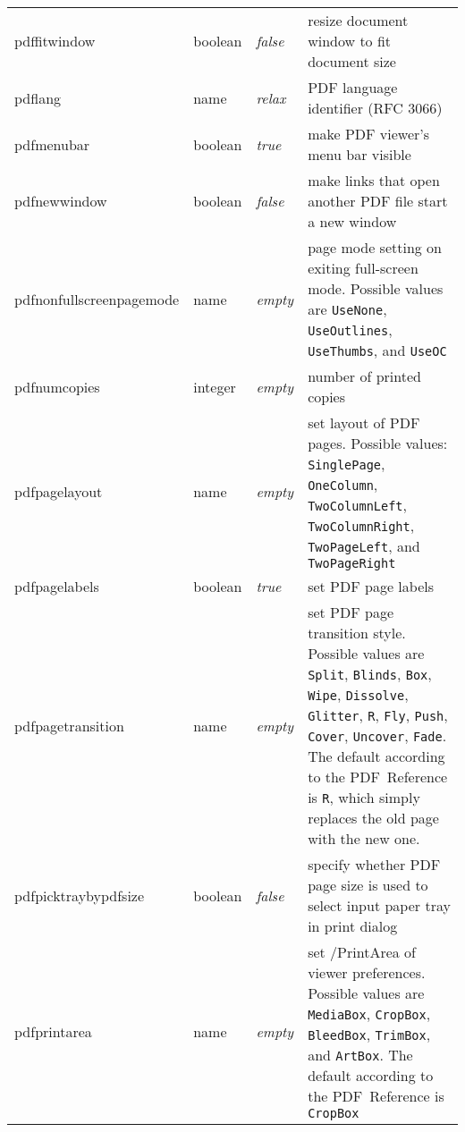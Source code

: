 \documentclass{article}
\begin{document}
\begin{longtable}{@{}>{\ttfamily}l>{\raggedright}p{}>{\itshape}lp{7cm}@{}}
pdffitwindow       & boolean & false & resize document window to fit document size \\
pdflang            & name    & relax & PDF language identifier (RFC 3066)\\
pdfmenubar         & boolean & true  & make PDF viewer's menu bar visible \\
pdfnewwindow       & boolean & false & make links that open another PDF file start a new window \\
pdfnonfullscreenpagemode
                   & name    & empty & page mode setting on exiting full-screen mode. Possible values are
                                       \verb|UseNone|, \verb|UseOutlines|, \verb|UseThumbs|, and \verb|UseOC|\\
pdfnumcopies       & integer & empty & number of printed copies \\
pdfpagelayout      & name    & empty & set layout of PDF pages.  Possible values:
                                       \verb|SinglePage|, \verb|OneColumn|,
                                       \verb|TwoColumnLeft|, \verb|TwoColumnRight|,
                                       \verb|TwoPageLeft|, and \verb|TwoPageRight| \\
pdfpagelabels      & boolean & true  & set PDF page labels \\
pdfpagetransition  & name    & empty & set PDF page transition style. Possible values are
                                       \verb|Split|, \verb|Blinds|, \verb|Box|, \verb|Wipe|,
                                       \verb|Dissolve|, \verb|Glitter|, \verb|R|,
                                       \verb|Fly|, \verb|Push|,
                                       \verb|Cover|, \verb|Uncover|,
                                       \verb|Fade|.
                                       The default according to the PDF~Reference is \verb|R|,
                                       which simply replaces the old page with the new one. \\
pdfpicktraybypdfsize
                   & boolean & false & specify whether PDF page size is used to select input paper tray in print dialog \\
pdfprintarea       & name    & empty & set /PrintArea of viewer preferences.  Possible values are
                                       \verb|MediaBox|, \verb|CropBox|,
                                       \verb|BleedBox|, \verb|TrimBox|, and \verb|ArtBox|.
                                       The default according to the PDF~Reference is \verb|CropBox| \\

\end{longtable}
\end{document}
